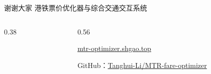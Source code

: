 \documentclass[aspectratio=169,10pt]{beamer}
\begin{document}
\begin{frame}{谢谢大家}
  \centering
  {\Large 港铁票价优化器与综合交通交互系统}\par\vspace{1.0em}
  \begin{columns}[c,onlytextwidth]
    \begin{column}{0.38\textwidth}
      \centering
    \end{column}
    \begin{column}{0.56\textwidth}
      \raggedright
      {\Large \href{https://mtr-optimizer.shgao.top}{mtr-optimizer.shgao.top}}\par\vspace{0.7em}
      {\small GitHub：\href{https://github.com/Tanghui-Li/MTR-fare-optimizer/}{Tanghui-Li/MTR-fare-optimizer}}
    \end{column}
  \end{columns}
\end{frame}
\end{document}

